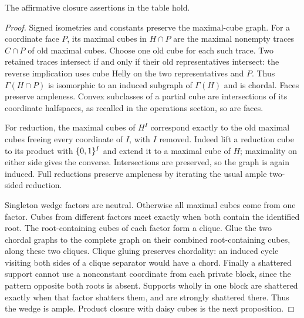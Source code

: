 \begin{proposition}
\label{prop:cube-chordal-closures}
The affirmative closure assertions in the table hold.
\end{proposition}
\begin{proof}
Signed isometries and constants preserve the maximal-cube graph.
For a coordinate face $P$, its maximal cubes in $H\cap P$ are the maximal
nonempty traces $C\cap P$ of old maximal cubes. Choose one old cube for
each such trace. Two retained traces intersect if and only if their old
representatives intersect: the reverse implication uses cube Helly on
the two representatives and $P$. Thus $\Gamma(H\cap P)$ is isomorphic
to an induced subgraph of $\Gamma(H)$ and is chordal. Faces preserve
ampleness. Convex subclasses of a partial cube are intersections of its
coordinate halfspaces, as recalled in the operations section, so are faces.

For reduction, the maximal cubes of $H^I$ correspond exactly to the old
maximal cubes freeing every coordinate of $I$, with $I$ removed.
Indeed lift a reduction cube to its product with $\{0,1\}^I$ and extend it
to a maximal cube of $H$; maximality on either side gives the converse.
Intersections are preserved, so the graph is again induced. Full reductions
preserve ampleness by iterating the usual ample two-sided reduction.

Singleton wedge factors are neutral. Otherwise all maximal cubes come
from one factor. Cubes from different factors meet exactly when both
contain the identified root. The root-containing cubes of each factor
form a clique. Glue the two chordal graphs to the complete graph on
their combined root-containing cubes, along these two cliques.
Clique gluing preserves chordality: an induced cycle visiting both sides
of a clique separator would have a chord. Finally a shattered support
cannot use a nonconstant coordinate from each private block, since the
pattern opposite both roots is absent. Supports wholly in one block are
shattered exactly when that factor shatters them, and are strongly
shattered there. Thus the wedge is ample. Product closure with daisy cubes
is the next proposition.
\end{proof}

